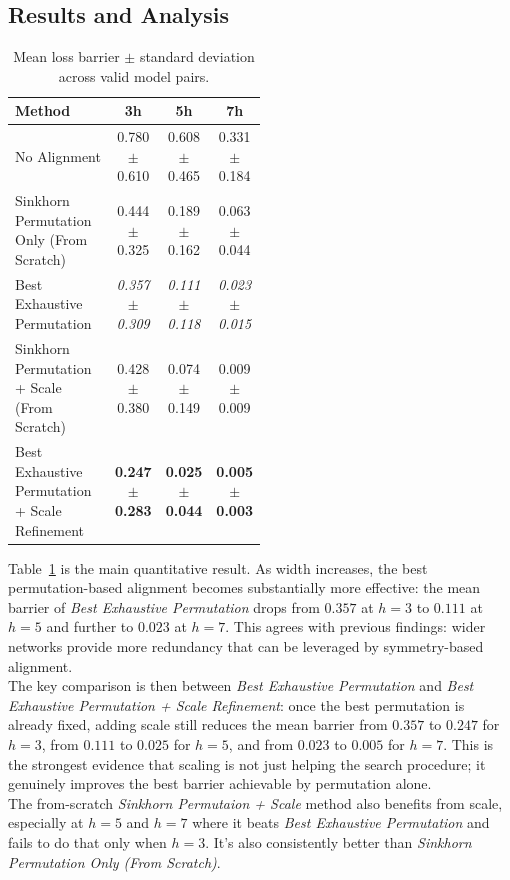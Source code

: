 \documentclass[11pt,a4paper]{article}
\begin{document}
\subsection{Results and Analysis}

\begin{table}[H]
\centering
\small
\begin{tabular}{p{0.50\linewidth}ccc}
\toprule
\textbf{Method} & \textbf{3h} & \textbf{5h} & \textbf{7h} \\
\midrule
No Alignment & 0.780 $\pm$ 0.610 & 0.608 $\pm$ 0.465 & 0.331 $\pm$ 0.184 \\
Sinkhorn Permutation Only (From Scratch) & 0.444 $\pm$ 0.325 & 0.189 $\pm$ 0.162 & 0.063 $\pm$ 0.044 \\
Best Exhaustive Permutation & \textit{0.357} $\pm$ \textit{0.309} & \textit{0.111} $\pm$ \textit{0.118} & \textit{0.023} $\pm$ \textit{0.015} \\
Sinkhorn Permutation + Scale (From Scratch) & 0.428 $\pm$ 0.380 & 0.074 $\pm$ 0.149 & 0.009 $\pm$ 0.009 \\
Best Exhaustive Permutation + Scale Refinement & \textbf{0.247 $\pm$ 0.283} & \textbf{0.025 $\pm$ 0.044} & \textbf{0.005 $\pm$ 0.003} \\
\bottomrule
\end{tabular}
\caption{Mean loss barrier $\pm$ standard deviation across valid model pairs.}
\label{tab:xor_loss_barrier}
\end{table}

Table~\ref{tab:xor_loss_barrier} is the main quantitative result. As width increases, the best permutation-based alignment becomes substantially more effective: the mean barrier of \emph{Best Exhaustive Permutation} drops from $0.357$ at $h=3$ to $0.111$ at $h=5$ and further to $0.023$ at $h=7$. This agrees with previous findings: wider networks provide more redundancy that can be leveraged by symmetry-based alignment.\\
\newline
The key comparison is then between \emph{Best Exhaustive Permutation} and \emph{Best Exhaustive Permutation + Scale Refinement}: once the best permutation is already fixed, adding scale still reduces the mean barrier from $0.357$ to $0.247$ for $h=3$, from $0.111$ to $0.025$ for $h=5$, and from $0.023$ to $0.005$ for $h=7$. This is the strongest evidence that scaling is not just helping the search procedure; it genuinely improves the best barrier achievable by permutation alone. \\
\newline
\newpage
The from-scratch \emph{Sinkhorn Permutaion + Scale} method also benefits from scale, especially at $h=5$ and $h=7$ where it beats \emph{Best Exhaustive Permutation} and fails to do that only when $h=3$. It's also consistently better than \emph{Sinkhorn Permutation Only (From Scratch)}.
\end{document}
